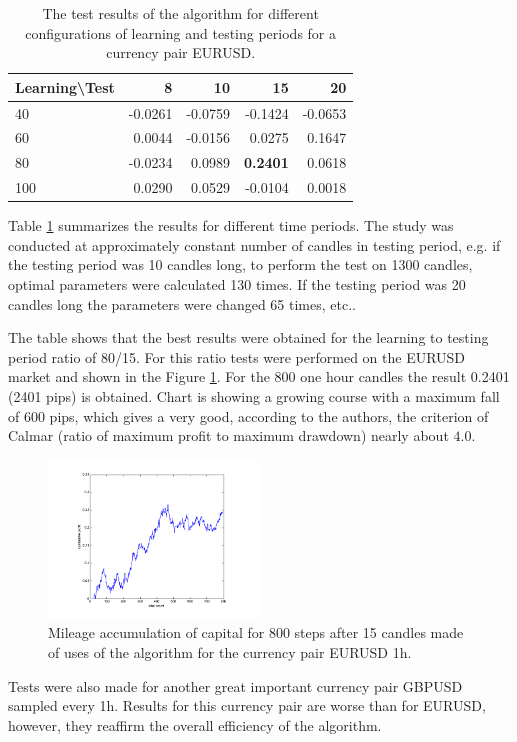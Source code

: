 \documentclass[runningheads,a4paper]{llncs}
\begin{document}
\begin{table}[h!]
\centering
\caption{The test results of the algorithm for different configurations of learning and testing periods for a currency pair EURUSD.}
\label{tab:tab1}
\begin{tabular}{|l|r|r|r|r|} \hline
Learning\textbackslash Test &	8	 &	10 &		15	 &	20 \\ \hline
40 &		-0.0261 &		-0.0759	 &	-0.1424	 &	-0.0653 \\ \hline
60 &		0.0044 &		-0.0156 &		0.0275 &		0.1647 \\ \hline
80 &		-0.0234 &		0.0989 &		\textbf{0.2401} &		0.0618 \\ \hline
100	 &	0.0290 &		0.0529 &		-0.0104	 &	0.0018 \\ \hline
\end{tabular}
\end{table}
\FloatBarrier
Table \ref{tab:tab1} summarizes the results for different time periods. The study was conducted at approximately constant number of candles in testing period, e.g. if the testing period was 10 candles long, to perform the test on 1300 candles, optimal parameters were calculated 130 times. If the testing period was 20 candles long the parameters were changed 65 times, etc..

The table shows that the best results were obtained for the learning to testing period ratio of 80/15. For this ratio tests were performed on the EURUSD market and shown in the Figure \ref{fig:fig8}. For the 800 one hour candles the result 0.2401 (2401 pips) is obtained. Chart is showing a growing course with a maximum fall of 600 pips, which gives a very good, according to the authors, the criterion of Calmar (ratio of maximum profit to maximum drawdown) nearly about $4.0$.\\

\begin{figure}[h!]
\centering
\includegraphics[width = 0.5\textwidth]{figures/rys8.png}
\caption{Mileage accumulation of capital for 800 steps after 15 candles made of uses of the algorithm for the currency pair EURUSD 1h.}
\label{fig:fig8}
\end{figure}
\FloatBarrier
\vspace{-1em}
Tests were also made for another great important currency pair GBPUSD sampled every 1h. Results for this currency pair are worse than for EURUSD, however, they reaffirm the overall efficiency of the algorithm.\\
\end{document}
